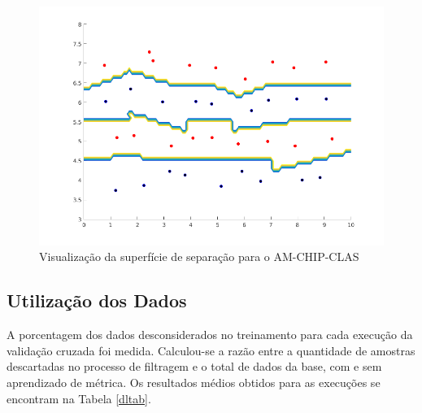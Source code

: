 \documentclass[
	12pt,				%
	openright,			%
	twoside,			%
	a4paper,			%
	english,			%
	spanish,			%
	brazil,				%
	]{abntex2}\usepackage[]{graphicx}\usepackage[]{color}
\begin{document}
\begin{figure}[ht]
\includegraphics[width=\textwidth]{newsup}
\caption{Visualização da superfície de separação para o AM-CHIP-CLAS}
\label{supnova}
\end{figure}


\subsection{Utilização dos Dados}

A porcentagem dos dados desconsiderados no treinamento para cada execução da validação cruzada foi medida. Calculou-se a razão entre a quantidade de amostras descartadas no processo de filtragem e o total de dados da base, com e sem aprendizado de métrica. Os resultados médios obtidos para as execuções se encontram na Tabela \ref{dltab}.
\end{document}
